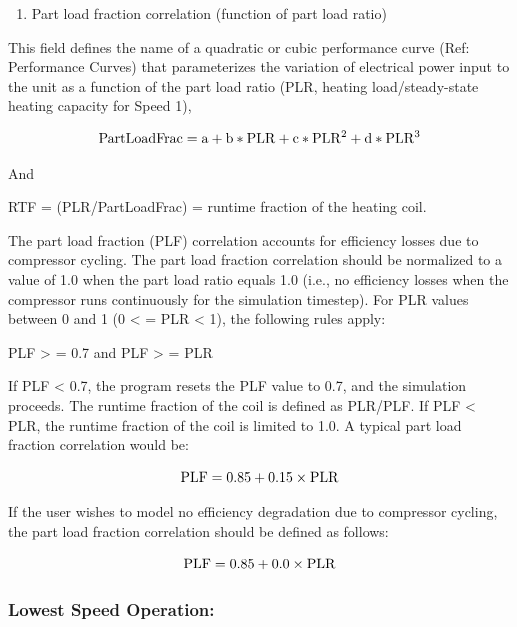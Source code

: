 \begin{enumerate}
\def\labelenumi{\arabic{enumi})}
\setcounter{enumi}{4}
\tightlist
\item
  Part load fraction correlation (function of part load ratio)
\end{enumerate}

This field defines the name of a quadratic or cubic performance curve (Ref: Performance Curves) that parameterizes the variation of electrical power input to the unit as a function of the part load ratio (PLR, heating load/steady-state heating capacity for Speed 1),

\begin{equation}
{\rm{PartLoadFrac}} = {\rm{a}} + {\rm{b*PLR}} + {\rm{c*PL}}{{\rm{R}}^2} + {\rm{d*PL}}{{\rm{R}}^3}
\end{equation}

And

RTF = (PLR/PartLoadFrac) = runtime fraction of the heating coil.

The part load fraction (PLF) correlation accounts for efficiency losses due to compressor cycling. The part load fraction correlation should be normalized to a value of 1.0 when the part load ratio equals 1.0 (i.e., no efficiency losses when the compressor runs continuously for the simulation timestep). For PLR values between 0 and 1 (0 \textless{} = PLR \textless{} 1), the following rules apply:

PLF \textgreater{} = 0.7 and PLF \textgreater{} = PLR

If PLF \textless{} 0.7, the program resets the PLF value to 0.7, and the simulation proceeds. The runtime fraction of the coil is defined as PLR/PLF. If PLF \textless{} PLR, the runtime fraction of the coil is limited to 1.0. A typical part load fraction correlation would be:

\begin{equation}
{\rm{PLF}} = 0.85 + 0.15 \times {\rm{PLR}}
\end{equation}

If the user wishes to model no efficiency degradation due to compressor cycling, the part load fraction correlation should be defined as follows:

\begin{equation}
{\rm{PLF}} = 0.85 + 0.0 \times {\rm{PLR}}
\end{equation}

\subsubsection{Lowest Speed Operation:}\label{lowest-speed-operation-201605050922}


